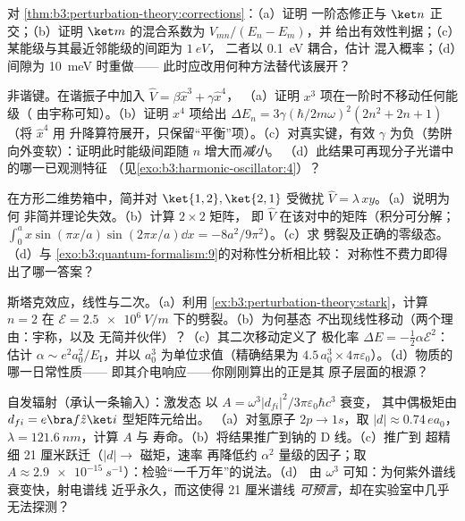 \begin{exercise}[$\star$]\label{exo:b3:perturbation-theory:4}
对 \cref{thm:b3:perturbation-theory:corrections}：（a）证明
一阶态修正与 $\ket n$ 正交；（b）证明
$\ket m$ 的混合系数为 $V_{mn}/(E_n - E_m)$，并
给出有效性判据；（c）某能级与其最近邻能级的间距为 $\qty{1}{eV}$，
二者以 \qty{0.1}{eV} 耦合，估计
混入概率；（d）间隙为 \qty{10}{meV} 时重做——
此时应改用何种方法替代该展开？
\end{exercise}

\begin{exercise}[$\star\star$]\label{exo:b3:perturbation-theory:5}
非谐键。在谐振子中加入 $\hat V = \beta\hat x^3 + \gamma\hat x^4$，
（a）证明 $x^3$ 项在一阶时不移动任何能级（
由宇称可知）。（b）证明 $x^4$ 项给出 $\Delta E_n =
3\gamma(\hbar/2m\omega)^2(2n^2 + 2n + 1)$（将 $\hat x^4$ 用
升降算符展开，只保留“平衡”项）。（c）对真实键，有效 $\gamma$ 为负（势阱
向外变软）：证明此时能级间距随
$n$ 增大而\emph{减小}。
（d）此结果可再现分子光谱中的哪一已观测特征
（见\cref{exo:b3:harmonic-oscillator:4}）？
\end{exercise}

\begin{exercise}[$\star\star$]\label{exo:b3:perturbation-theory:6}
在方形二维势箱中，简并对 $\ket{1,2},
\ket{2,1}$ 受微扰 $\hat V = \lambda\,xy$。（a）说明为何
非简并理论失效。（b）计算 $2\times2$ 矩阵，
即 $\hat V$ 在该对中的矩阵（积分可分解；$\int_0^a
x\sin(\pi x/a)\sin(2\pi x/a)\dd x = -8a^2/9\pi^2$）。（c）求
劈裂及正确的零级态。（d）与
\cref{exo:b3:quantum-formalism:9}的对称性分析相比较：
对称性不费力即得出了哪一答案？
\end{exercise}

\begin{exercise}[$\star\star$]\label{exo:b3:perturbation-theory:7}
斯塔克效应，线性与二次。（a）利用
\cref{ex:b3:perturbation-theory:stark}，计算 $n = 2$
在 $\mathcal E = \qty{2.5e6}{V/m}$ 下的劈裂。（b）为何基态
\emph{不}出现线性移动（两个理由：宇称，以及
无简并伙伴）？（c）其二次移动定义了
极化率 $\Delta E = -\tfrac12\alpha\mathcal E^2$：估计
$\alpha \sim e^2a_0^2/E_{\text{I}}$，并以
$a_0^3$ 为单位求值（精确结果为 $4.5\,a_0^3 \times
4\pi\varepsilon_0$）。（d）物质的哪一日常性质——
即其介电响应——你刚刚算出的正是其
原子层面的根源？
\end{exercise}

\begin{exercise}[$\star\star$]\label{exo:b3:perturbation-theory:8}
自发辐射（承认一条输入）：激发态
以 $A = \omega^3|d_{fi}|^2/3\pi\varepsilon_0\hbar c^3$ 衰变，
其中偶极矩由 $d_{fi} = e\bra f\hat z\ket i$ 型矩阵元给出。
（a）对氢原子 $2p \to 1s$，取 $|d| \approx 0.74\,
ea_0$，$\lambda = \qty{121.6}{nm}$，计算 $A$ 与
寿命。（b）将结果推广到钠的 D 线。（c）推广到
超精细 21 厘米跃迁（$|d| \to$ 磁矩，速率
再降低约 $\alpha^2$ 量级的因子；取 $A \approx
\qty{2.9e-15}{s^{-1}}$）：检验“一千万年”的说法。（d）
由 $\omega^3$ 可知：为何紫外谱线衰变快，射电谱线
近乎永久，而这使得 21 厘米谱线
\emph{可预言}，却在实验室中几乎无法探测？
\end{exercise}

